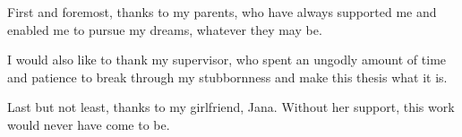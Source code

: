 \documentclass[english,master,unicode,bw]{ctufit-thesis}
\begin{document}
 
\frontmatter\frontmatterinit %


\thispagestyle{empty}\cleardoublepage\maketitle %

\imprintpage %

\tableofcontents %
\listoffigures %
\begingroup
\let\clearpage\relax
\listoftables %
\endgroup

\begin{acknowledgmentpage}
First and foremost, thanks to my parents, who have always supported me and
    enabled me to pursue my dreams, whatever they may be.

    I would also like to thank my supervisor, who spent an ungodly amount of
    time and patience to break through my stubbornness and make this thesis
    what it is.

    Last but not least, thanks to my girlfriend, Jana. Without her support,
    this work would never have come to be.
\end{acknowledgmentpage} 
\end{document}
